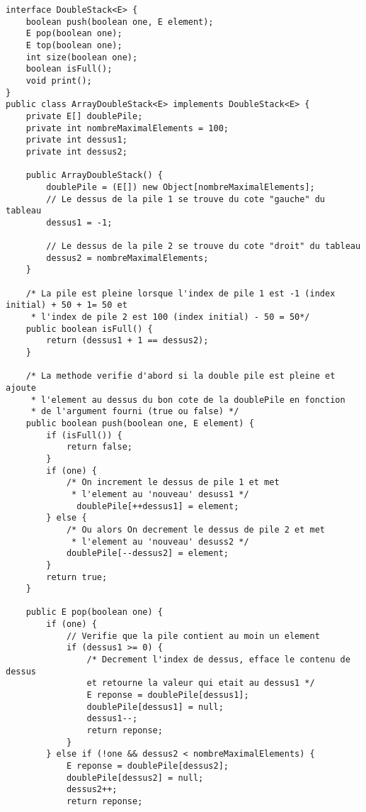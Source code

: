 \documentclass[9pt]{report}
\begin{document}
    \begin{lstlisting}[style=JavaDraculaWhite]
 interface DoubleStack<E> {
    boolean push(boolean one, E element);
    E pop(boolean one);
    E top(boolean one);
    int size(boolean one);
    boolean isFull();
    void print();
}      
public class ArrayDoubleStack<E> implements DoubleStack<E> {
    private E[] doublePile;
    private int nombreMaximalElements = 100;
    private int dessus1;
    private int dessus2;

    public ArrayDoubleStack() {
        doublePile = (E[]) new Object[nombreMaximalElements];
        // Le dessus de la pile 1 se trouve du cote "gauche" du tableau
        dessus1 = -1;

        // Le dessus de la pile 2 se trouve du cote "droit" du tableau
        dessus2 = nombreMaximalElements;
    }

    /* La pile est pleine lorsque l'index de pile 1 est -1 (index initial) + 50 + 1= 50 et 
     * l'index de pile 2 est 100 (index initial) - 50 = 50*/
    public boolean isFull() {
        return (dessus1 + 1 == dessus2);
    }

    /* La methode verifie d'abord si la double pile est pleine et ajoute 
     * l'element au dessus du bon cote de la doublePile en fonction 
     * de l'argument fourni (true ou false) */
    public boolean push(boolean one, E element) {
        if (isFull()) {
            return false;
        }
        if (one) {
            /* On increment le dessus de pile 1 et met 
             * l'element au 'nouveau' desuss1 */
              doublePile[++dessus1] = element;
        } else {
            /* Ou alors On decrement le dessus de pile 2 et met 
             * l'element au 'nouveau' desuss2 */
            doublePile[--dessus2] = element;
        }
        return true;
    }
    
    public E pop(boolean one) {
        if (one) {
            // Verifie que la pile contient au moin un element
            if (dessus1 >= 0) {
                /* Decrement l'index de dessus, efface le contenu de dessus 
                et retourne la valeur qui etait au dessus1 */ 
                E reponse = doublePile[dessus1];
                doublePile[dessus1] = null; 
                dessus1--; 
                return reponse;
            }
        } else if (!one && dessus2 < nombreMaximalElements) {
            E reponse = doublePile[dessus2]; 
            doublePile[dessus2] = null;
            dessus2++;
            return reponse;  
            

\end{lstlisting}
\end{document}
